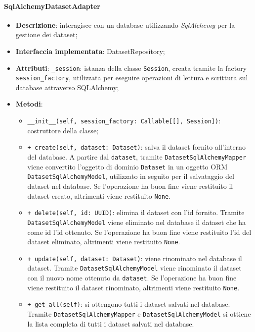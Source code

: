 \paragraph{SqlAlchemyDatasetAdapter}
\begin{itemize}
    \item \textbf{Descrizione}: interagisce con un database utilizzando \textit{SqlAlchemy} per la gestione dei dataset;
    \item \textbf{Interfaccia implementata}: DatasetRepository;
    \item \textbf{Attributi}: \lstinline|_session|: istanza della classe \lstinline|Session|, creata tramite la factory \lstinline|session_factory|, utilizzata per eseguire operazioni di lettura e scrittura sul database attraverso SQLAlchemy;
    \item \textbf{Metodi}:
    \begin{itemize}
        \item \lstinline|__init__(self, session_factory: Callable[[], Session])|: costruttore della classe;
        \item \lstinline|+ create(self, dataset: Dataset)|: salva il dataset fornito all'interno del database.
        A partire dal \lstinline|dataset|, tramite \lstinline|DatasetSqlAlchemyMapper| viene convertito l'oggetto di dominio \lstinline|Dataset| in un oggetto ORM \lstinline|DatasetSqlAlchemyModel|, utilizzato in seguito per il salvataggio del dataset nel database.
        Se l'operazione ha buon fine viene restituito il dataset creato, altrimenti viene restituito \lstinline|None|.
        \item \lstinline|+ delete(self, id: UUID)|: elimina il dataset con l'id fornito.
        Tramite \lstinline|DatasetSqlAlchemyModel| viene eliminato nel database il dataset che ha come id l'id ottenuto.
        Se l'operazione ha buon fine viene restituito l'id del dataset eliminato, altrimenti viene restituito \lstinline|None|.
        \item \lstinline|+ update(self, dataset: Dataset)|: viene rinominato nel database il dataset.
        Tramite \lstinline|DatasetSqlAlchemyModel| viene rinominato il dataset con il nuovo nome ottenuto da \lstinline|dataset|.
        Se l'operazione ha buon fine viene restituito il dataset rinominato, altrimenti viene restituito \lstinline|None|.
        \item \lstinline|+ get_all(self)|: si ottengono tutti i dataset salvati nel database.
        Tramite \lstinline|DatasetSqlAlchemyMapper| e \lstinline|DatasetSqlAlchemyModel| si ottiene la lista completa di tutti i dataset salvati nel database.

\end{itemize}
\end{itemize}
